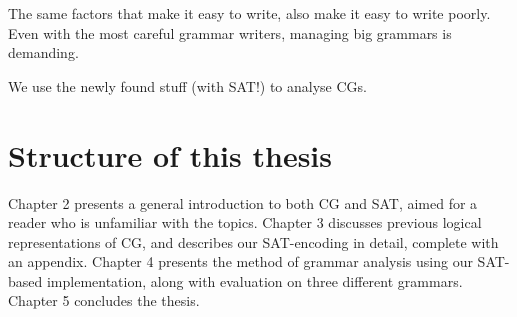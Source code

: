 The same factors that make it easy to write, also make it easy to write poorly.  
Even with the most careful grammar writers, managing big grammars is demanding.

We use the newly found stuff (with SAT!) to analyse CGs.







\section{Structure of this thesis}

Chapter 2 presents a general introduction to both CG and SAT, aimed for a reader who is unfamiliar with the topics.
Chapter 3 discusses previous logical representations of CG, and describes our SAT-encoding in detail, complete with an appendix.
Chapter 4 presents the method of grammar analysis using our SAT-based implementation, along with evaluation on three different grammars.
Chapter 5 concludes the thesis.

